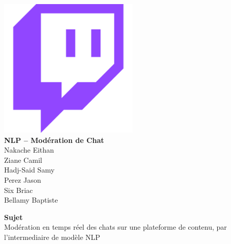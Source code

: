 \begin{titlepage} 
    \begin{center}
     \vspace*{\fill}  %
        \includegraphics[width=0.5\textwidth]{figures/twitch.png}\\
        \vspace{2cm}
        \textbf{\Large NLP – Modération de Chat}\\    
        \vspace{2cm}
        Nakache Eithan \\
        Ziane Camil \\
        Hadj-Said Samy \\
        Perez Jason \\
        Six Briac \\
        Bellamy Baptiste
        \vspace{2cm} 
     \vspace*{\fill}  %
             
 \textbf{Sujet}\\
    Modération en temps réel des chats sur une plateforme de contenu, par l'intermediaire de modèle NLP\
\end{center}

\end{titlepage}